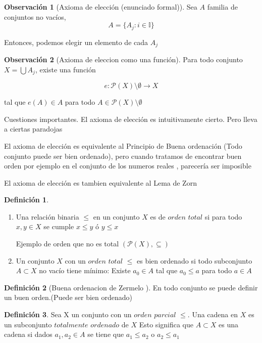 \documentclass[12pt]{article}
\newcommand{\I}{\mathbb{I}}
\newcommand{\ra}{\rightarrow}
\theoremstyle{definition}
\newtheorem{definition}{Definición}[section]
\newtheorem*{remark}{Observación}
\begin{document}
\begin{remark}[Axioma de elección (enunciado formal)]
  Sea $A$ familia de conjuntos no vacíos, 
  $$ A = \{A_{j}: i \in \I\}$$

  Entonces, podemos elegir un elemento de cada $A_{j}$
\end{remark}

\begin{remark}[Axioma de eleccion como una función] 

  Para todo conjunto $X = \bigcup A_{j}$, existe una función 

  $$e: \mathcal{P}(X) \setminus \emptyset \ra X$$

tal que $e(A) \in A$ para todo $A \in \mathcal{P}(X) \setminus \emptyset$
\end{remark}

Cuestiones importantes. El axioma de elección es intuitivamente cierto. Pero lleva a ciertas paradojas

El axioma de elección es equivalente al Principio de Buena ordenación (Todo conjunto puede ser bien ordenado), pero cuando tratamos de encontrar buen orden por ejemplo en el conjunto de los numeros reales , parecería ser imposible 

El axioma de elección es tambien equivalente al Lema de Zorn

\begin{definition} $ $ 
  \begin{enumerate}
    \item Una relación binaria $\leq$ en un conjunto $X$ es de $orden$ $total$ si para todo $x,y \in X$ se cumple $x \leq y$ ó $y \leq x$ 

Ejemplo de orden que no es total $(\mathcal{P}(X), \subseteq)$
\item Un conjunto $X$ con un $orden$ $total$ $\leq$ es bien ordenado si todo subconjunto $A \subset X$ no vacío tiene mínimo: Existe $a_{0} \in A$ tal que $a_{0} \leq a$ para todo $a \in A$
\end{enumerate}
\end{definition}

\begin{definition}[Buena ordenacion de Zermelo ]
  En todo conjunto se puede definir un buen orden.(Puede ser bien ordenado)
\end{definition}

\begin{definition}
  Sea X un conjunto con un $ orden$ $parcial$ $\leq$. Una cadena en $X$ es un subconjunto $totalmente$ $ordenado$ de $X$ 
  Esto significa que $A \subset X$ es una cadena si dados $a_{1}, a_{2} \in A$ se tiene que $a_{1} \leq a_{2}$ o $a_{2} \leq a_{1}$
\end{definition}
\end{document}
